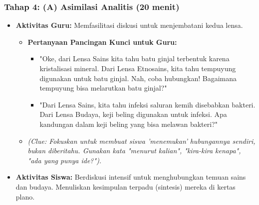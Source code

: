 \documentclass[a4paper,12pt]{article}
\begin{document}
\subsubsection{Tahap 4: (A) Asimilasi Analitis (20 menit)}
\begin{itemize}
\item \textbf{Aktivitas Guru:} Memfasilitasi diskusi untuk menjembatani kedua lensa.
    \begin{itemize}
    \item \textbf{Pertanyaan Pancingan Kunci untuk Guru:}
        \begin{itemize}
        \item "Oke, dari Lensa Sains kita tahu batu ginjal terbentuk karena kristalisasi mineral. Dari Lensa Etnosains, kita tahu tempuyung digunakan untuk batu ginjal. Nah, coba hubungkan! Bagaimana tempuyung bisa melarutkan batu ginjal?"
        \item "Dari Lensa Sains, kita tahu infeksi saluran kemih disebabkan bakteri. Dari Lensa Budaya, keji beling digunakan untuk infeksi. Apa kandungan dalam keji beling yang bisa melawan bakteri?"
        \end{itemize}
    \item \textit{(Clue: Fokuskan untuk membuat siswa 'menemukan' hubungannya sendiri, bukan diberitahu. Gunakan kata "menurut kalian", "kira-kira kenapa", "ada yang punya ide?").}
    \end{itemize}
\item \textbf{Aktivitas Siswa:} Berdiskusi intensif untuk menghubungkan temuan sains dan budaya. Menuliskan kesimpulan terpadu (sintesis) mereka di kertas plano.
\end{itemize}
\end{document}
